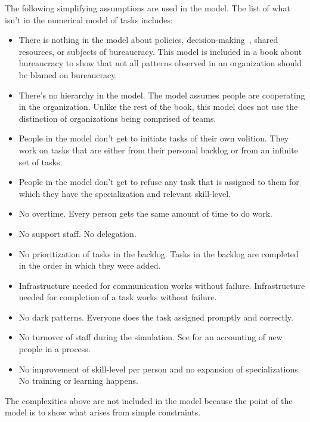 The following simplifying assumptions are used in the model. The list of what isn't in the numerical model of tasks includes:
\begin{itemize}
    \item There is nothing in the model about policies, decision-making~\cite{2009_Klimek}, shared resources, or subjects of bureaucracy. This model is included in a book about bureaucracy to show that not all patterns observed in an organization should be blamed on bureaucracy. 
    \item There's no hierarchy in the model. The model assumes people are cooperating in the organization. Unlike the rest of the book, this model does not use the distinction of organizations being comprised of teams.
    \item People in the model don't get to initiate tasks of their own volition. They work on tasks that are either from their personal backlog or from an infinite set of tasks.
    \item People in the model don't get to refuse any task that is assigned to them for which they have the specialization and relevant skill-level.
    \item No overtime. Every person gets the same amount of time to do work.
    \item No support staff. No delegation. 
    \item No prioritization of tasks in the backlog. Tasks in the backlog are completed in the order in which they were added. 
    \item Infrastructure needed for communication works without failure. Infrastructure needed for completion of a task works without failure. 
    \item No dark patterns. Everyone does the task assigned promptly and correctly.
    \item No turnover of staff during the simulation. See \iftoggle{haspagenumbers}{page~\pageref{sec:new-person}}{section~\ref{sec:new-person}} for an accounting of new people in a process.
    \item No improvement of skill-level per person and no expansion of specializations. No training or learning happens. %
\end{itemize}
The complexities above are not included in the model because the point of the model is to show what arises from simple constraints. 

